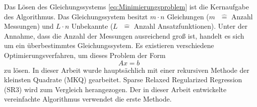Das Lösen des Gleichungssystems \eqref{eq:Minimierungsproblem} ist die Kernaufgabe des Algorithmus. Das Gleichungssystem besitzt $m\cdot n$ Gleichungen ($m\text{ } \hat{=}$ Anzahl Messungen) und $L\cdot n$ Unbekannte ($L\text{ } \hat{=}$ Anzahl Ansatzfunktionen). Unter der Annahme, dass die Anzahl der Messungen ausreichend groß ist, handelt es sich um ein überbestimmtes Gleichungssystem. Es existieren verschiedene Optimierungsverfahren, um dieses Problem der Form
\begin{equation}
Ax=b
\end{equation}
zu lösen. In dieser Arbeit wurde hauptsächlich mit einer rekursiven Methode der kleinsten Quadrate (MKQ) gearbeitet. Sparse Relaxed Regularized Regression (SR3) wird zum Vergleich herangezogen. Der in dieser Arbeit entwickelte vereinfachte Algorithmus verwendet die erste Methode. 